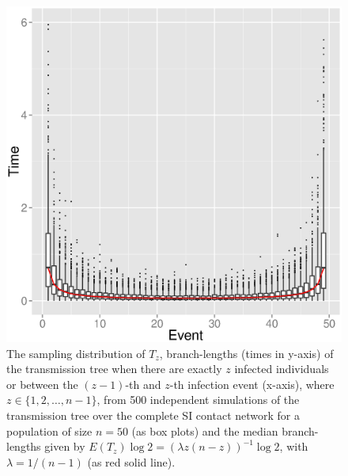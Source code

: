 \documentclass[review]{elsarticle}
\numberwithin{equation}{section}
\begin{document}
\begin{figure}[htbp]
\includegraphics[width=0.95\linewidth]{figures/timesbox.eps}
\caption{The sampling distribution of $T_z$, branch-lengths (times in y-axis) of the transmission tree when there are exactly $z$ infected individuals or between the $(z-1)$-th and $z$-th infection event (x-axis), where $z \in \{1,2,\ldots,n-1\}$, from 500 independent simulations of the transmission tree over the complete SI contact network for a population of size $n=50$ (as box plots) and the median branch-lengths given by $E(T_z) \log 2=(\lambda z (n-z))^{-1}\log 2$, with $\lambda=1/(n-1)$ (as red solid line).\label{F:timesbox}}
\end{figure}
\end{document}
